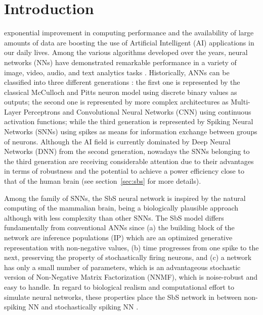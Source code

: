 
\section{Introduction}
\label{sec:introduction}
 exponential improvement in computing performance and the availability of large amounts of data are boosting the use of Artificial Intelligent (AI) applications in our daily lives. Among the various algorithms developed over the years, neural networks (NNs) have demonstrated remarkable performance in a variety of image, video, audio, and text analytics tasks \cite{schmidhuber2015deep,Taigman_2014_CVPR}. Historically, ANNs can be classified into three different generations \cite{Design_Exploration_SbS_Trans20}: the first one is represented by the classical McCulloch and Pitts neuron model using discrete binary values as outputs; the second one is represented by more complex architectures as Multi-Layer Perceptrons and Convolutional Neural Networks (CNN) using continuous activation functions; while the third generation is represented by Spiking Neural Networks (SNNs) using spikes as means for information exchange between groups of neurons. Although the AI field is currently dominated by Deep Neural Networks (DNN) from the second generation, nowadays the SNNs belonging to the third generation are receiving considerable attention \cite{Spinnaker_Trans13,ernst2007efficient,Design_Exploration_SbS_Trans20, SNN_Survey_Trans19} due to their advantages in terms of robustness and the
potential to achieve a power efficiency close to that of the human
brain (see section~\ref{sec:sbs} for more details).

Among the family of SNNs, the SbS neural network \cite{ernst2007efficient} is inspired by the natural computing of the mammalian brain, being a biologically plausible approach although with less complexity than other SNNs. The SbS model differs fundamentally from conventional ANNs since (a) the building block of the network are inference populations (IP) which are an optimized generative representation with non-negative values, (b) time progresses from one spike to the next, preserving the property of stochastically firing neurons, and (c) a network has only a small number of parameters, which is an advantageous stochastic version of Non-Negative Matrix Factorization (NNMF), which is noise-robust and easy to handle. In regard to biological realism and computational effort to simulate neural networks, these properties place the SbS network in between non-spiking NN and stochastically spiking NN \cite{rotermund2019Backpropagation}.

